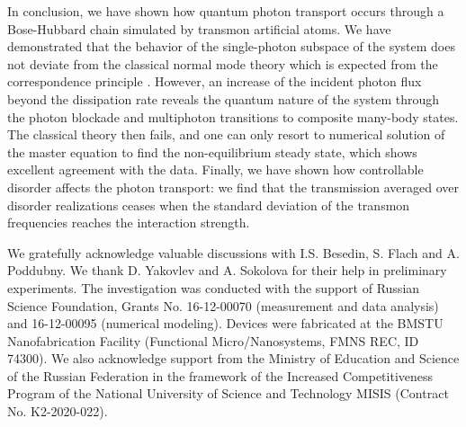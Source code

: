 \documentclass[%
 aps, prl,
 amsmath,amssymb,
 reprint,%
superscriptaddress
]{revtex4-2}
\begin{document}
In conclusion, we have shown how quantum photon transport occurs through a Bose-Hubbard chain simulated by transmon artificial atoms. We have demonstrated that the behavior of the single-photon subspace of the system does not deviate from the classical normal mode theory which is expected from the correspondence principle \cite{park2012classical}. However, an increase of the incident photon flux beyond the dissipation rate reveals the quantum nature of the system through the photon blockade and multiphoton transitions to composite many-body states. The classical theory then fails, and one can only resort to numerical solution of the master equation to find the non-equilibrium steady state, which shows excellent agreement with the data. Finally, we have shown how controllable disorder affects the photon transport: we find that the transmission averaged over disorder realizations ceases when the standard deviation of the transmon frequencies reaches the interaction strength.

We gratefully acknowledge valuable discussions with I.S. Besedin, S. Flach and A. Poddubny. We thank D. Yakovlev and A. Sokolova for their help in preliminary experiments. The investigation was conducted with the support of Russian Science Foundation, Grants No. 16-12-00070 (measurement and data analysis) and 16-12-00095 (numerical modeling). Devices were fabricated at the BMSTU Nanofabrication Facility (Functional Micro/Nanosystems, FMNS REC, ID 74300). We also acknowledge support from the Ministry of Education and Science of the Russian Federation in the framework of the Increased Competitiveness Program of the National University of Science and Technology MISIS (Contract No. K2-2020-022). 


\end{document}
